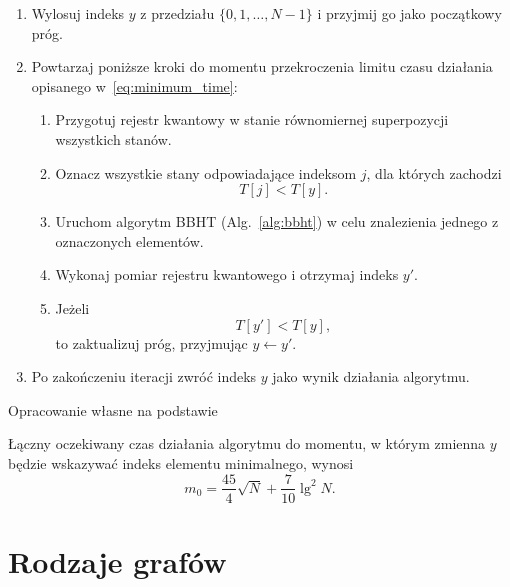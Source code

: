 \begin{algorithm}[H]
\caption{Kwantowy algorytm wyszukiwania minimum}
\label{alg:quantum_minimum}
\begin{enumerate}

    \item Wylosuj indeks $y$ z przedziału $\{0,1,\ldots,N-1\}$ i przyjmij go jako początkowy próg.

    \item Powtarzaj poniższe kroki do momentu przekroczenia limitu czasu działania opisanego w~\eqref{eq:minimum_time}:
    
    \begin{enumerate}
        \item Przygotuj rejestr kwantowy w stanie równomiernej superpozycji wszystkich stanów.

        \item Oznacz wszystkie stany odpowiadające indeksom $j$, dla których zachodzi
        \[
            T[j] < T[y].
        \]

        \item Uruchom algorytm BBHT (Alg.~\ref{alg:bbht}) w celu znalezienia jednego z oznaczonych elementów.

        \item Wykonaj pomiar rejestru kwantowego i otrzymaj indeks $y'$.

        \item Jeżeli
        \[
            T[y'] < T[y],
        \]
        to zaktualizuj próg, przyjmując $y \leftarrow y'$.
    \end{enumerate}

    \item Po zakończeniu iteracji zwróć indeks $y$ jako wynik działania algorytmu.

\end{enumerate}
\begin{center}
\small Opracowanie własne na podstawie \cite{duerr1996}
\end{center}

\end{algorithm}
\newpage
Łączny oczekiwany czas działania algorytmu do momentu, w którym zmienna $y$ będzie wskazywać indeks elementu minimalnego, wynosi~\cite{duerr1996}
\begin{equation}
\label{eq:minimum_time} 
m_0=\frac{45}{4}\sqrt{N}+\frac{7}{10}\lg^2 N.
\end{equation}

\section{Rodzaje grafów}
\label{sec:graph_types}

